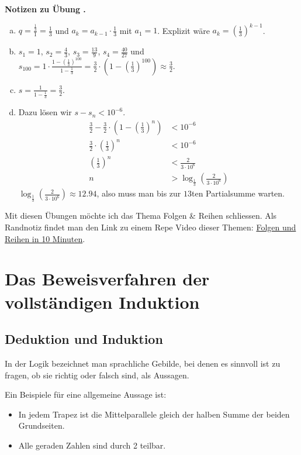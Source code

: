 \documentclass[%
11pt,%
twoside,%
titlepage,%
swissgerman,%
headsepline%
]{scrartcl}
\newcommand{\faReturnGray}{\textcolor{gray}{\faMailReply}} %
\newcommand{\definition}[1]{\colorbox{emerald}{#1}}
\theoremstyle{definition}
\theoremstyle{plain}
\newcommand{\concatueb}[1]{ueb:#1}%
\newcommand{\concatlsg}[1]{lsg:#1}%
\newcounter{uebcounter}[section]
\renewcommand{\theuebcounter}{\thesection.\arabic{uebcounter}}  %
\newenvironment{lsg}[1]{%
    \par\noindent\textbf{Notizen zu Übung \theuebcounter\label{\concatlsg{#1}}}
    \hfill\hyperref[\concatueb{#1}]{\faReturnGray}\par %
}{%
    \par%
}
\begin{document}
\begin{lsg}{kleineumgebungen}
    \begin{enumerate}[a)]
        \item $q=\frac{\frac{1}{3}}{1}=\frac{1}{3}$ und $a_k=a_{k-1}\cdot\frac{1}{3}$ mit $a_1=1$. Explizit wäre $a_k=(\tfrac{1}{3})^{k-1}$.
        \item $s_1=1$, $s_2=\frac{4}{3}$, $s_3=\frac{13}{9}$, $s_4=\frac{40}{27}$ und $s_{100}=1\cdot\frac{1-(\tfrac{1}{3})^{100}}{1-\tfrac{1}{3}}=\frac{3}{2}\cdot(1-(\tfrac{1}{3})^{100})\approx\frac{3}{2}$.
        \item $s=\frac{1}{1-\tfrac{1}{3}}=\frac{3}{2}$.
        \item Dazu lösen wir $s-s_n<10^{-6}$.
        \begin{align*}
            \frac{3}{2}-\frac{3}{2}\cdot(1-(\tfrac{1}{3})^{n}) &< 10^{-6}\\
            \frac{3}{2}\cdot(\tfrac{1}{3})^{n} &< 10^{-6}\\
            (\tfrac{1}{3})^{n} &< \frac{2}{3\cdot10^6}\\
            n &> \log_{\tfrac{1}{3}}(\tfrac{2}{3\cdot10^6})
        \end{align*}
        $\log_{\tfrac{1}{3}}(\tfrac{2}{3\cdot10^6})\approx12.94$, also muss man bis zur $13$ten Partialsumme warten.
    \end{enumerate}
\end{lsg}

Mit
diesen Übungen möchte ich das Thema Folgen \& Reihen schliessen. Als Randnotiz findet man den Link zu einem Repe Video dieser Themen: \href{https://youtu.be/BHmGodmIOr4?si=dsB15c4O-T6Bcf_J}{Folgen und Reihen in 10 Minuten}.

\pagebreak

\appendix

\section{Das Beweisverfahren der vollst\"andigen Induktion}
\subsection{Deduktion und Induktion}
In der Logik bezeichnet man sprachliche Gebilde, bei denen es sinnvoll ist zu fragen, ob sie richtig oder falsch sind, als \definition{Aussagen}.

Ein Beispiele f\"ur eine allgemeine Aussage ist:
\begin{itemize}
\item In jedem Trapez ist die Mittelparallele gleich der halben Summe der beiden Grundseiten.
\item Alle geraden Zahlen sind durch 2 teilbar.
\end{itemize}
\end{document}
